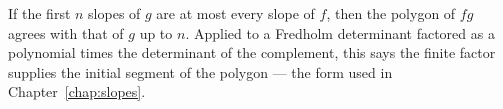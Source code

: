 \begin{corollary}
  \label{cor:np-product-initial}
  \leanok
  If the first $n$ slopes of $g$ are at most every slope of $f$, then the polygon of $fg$ agrees
  with that of $g$ up to $n$.  Applied to a Fredholm determinant factored as a polynomial times
  the determinant of the complement, this says the finite factor supplies the initial segment of
  the polygon --- the form used in Chapter~\ref{chap:slopes}.
\end{corollary}
